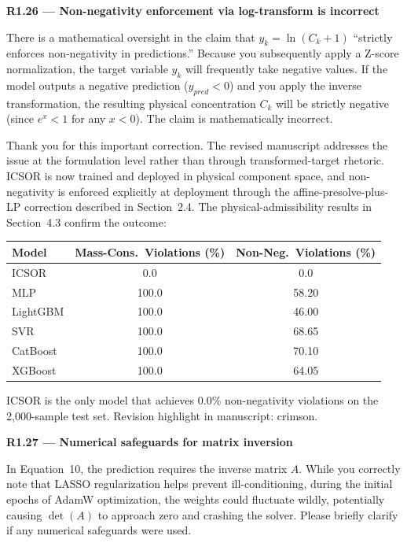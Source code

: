\documentclass[a4paper,11pt]{article}
\newcommand{\reviewlabel}[1]{\noindent\textbf{\textcolor{accentblue}{#1}}\par\medskip}
\newcommand{\revhighlight}[2]{\textcolor{#1}{Revision highlight in manuscript: #2.}}
\begin{document}
\reviewlabel{R1.26 --- Non-negativity enforcement via log-transform is incorrect}
\begin{reviewbox}
There is a mathematical oversight in the claim that $y_k = \ln(C_k + 1)$ ``strictly enforces non-negativity in predictions.'' Because you subsequently apply a Z-score normalization, the target variable $y_k$ will frequently take negative values. If the model outputs a negative prediction ($y_{pred} < 0$) and you apply the inverse transformation, the resulting physical concentration $C_k$ will be strictly negative (since $e^x < 1$ for any $x < 0$). The claim is mathematically incorrect.
\end{reviewbox}

Thank you for this important correction. The revised manuscript addresses the issue at the formulation level rather than through transformed-target rhetoric. ICSOR is now trained and deployed in physical component space, and non-negativity is enforced explicitly at deployment through the affine-presolve-plus-LP correction described in Section~2.4. The physical-admissibility results in Section~4.3 confirm the outcome:

\begin{center}
\small
\begin{tabular}{lcc}
\toprule
Model & Mass-Cons.\ Violations (\%) & Non-Neg.\ Violations (\%) \\
\midrule
ICSOR & 0.0 & 0.0 \\
MLP & 100.0 & 58.20 \\
LightGBM & 100.0 & 46.00 \\
SVR & 100.0 & 68.65 \\
CatBoost & 100.0 & 70.10 \\
XGBoost & 100.0 & 64.05 \\
\bottomrule
\end{tabular}
\end{center}
ICSOR is the only model that achieves 0.0\% non-negativity violations on the 2,000-sample test set. \revhighlight{revRtwoTwo}{crimson}

\reviewlabel{R1.27 --- Numerical safeguards for matrix inversion}
\begin{reviewbox}
In Equation~10, the prediction requires the inverse matrix $A$. While you correctly note that LASSO regularization helps prevent ill-conditioning, during the initial epochs of AdamW optimization, the weights could fluctuate wildly, potentially causing $\det(A)$ to approach zero and crashing the solver. Please briefly clarify if any numerical safeguards were used.
\end{reviewbox}
\end{document}
